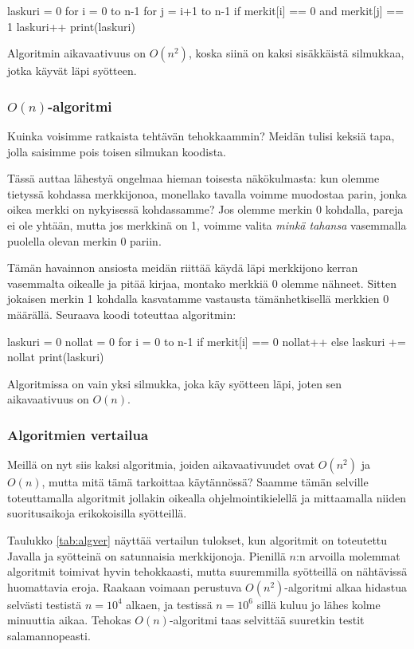 \begin{code}
laskuri = 0
for i = 0 to n-1
    for j = i+1 to n-1
        if merkit[i] == 0 and merkit[j] == 1
            laskuri++
print(laskuri)
\end{code}

Algoritmin aikavaativuus on $O(n^2)$, koska siinä on kaksi
sisäkkäistä silmukkaa, jotka käyvät läpi syötteen.

\subsubsection{$O(n)$-algoritmi}

Kuinka voisimme ratkaista tehtävän tehokkaammin?
Meidän tulisi keksiä tapa, jolla saisimme
pois toisen silmukan koodista.

Tässä auttaa lähestyä ongelmaa hieman toisesta
näkökulmasta: kun olemme tietyssä kohdassa merkkijonoa,
monellako tavalla voimme muodostaa parin,
jonka oikea merkki on nykyisessä kohdassamme?
Jos olemme merkin 0 kohdalla, pareja ei ole yhtään,
mutta jos merkkinä on 1, voimme valita \emph{minkä tahansa}
vasemmalla puolella olevan merkin 0 pariin.

Tämän havainnon ansiosta meidän riittää käydä läpi
merkkijono kerran vasemmalta oikealle ja pitää kirjaa,
montako merkkiä 0 olemme nähneet.
Sitten jokaisen merkin 1 kohdalla kasvatamme
vastausta tämänhetkisellä merkkien 0 määrällä.
Seuraava koodi toteuttaa algoritmin:

\begin{code}
laskuri = 0
nollat = 0
for i = 0 to n-1
    if merkit[i] == 0
        nollat++
    else
        laskuri += nollat
print(laskuri)
\end{code}

Algoritmissa on vain yksi silmukka, joka käy syötteen läpi,
joten sen aikavaativuus on $O(n)$.

\subsubsection{Algoritmien vertailua}

Meillä on nyt siis kaksi algoritmia, joiden aikavaativuudet ovat
$O(n^2)$ ja $O(n)$, mutta mitä tämä tarkoittaa käytännössä?
Saamme tämän selville toteuttamalla algoritmit jollakin
oikealla ohjelmointikielellä
ja mittaamalla niiden suoritusaikoja erikokoisilla syötteillä.

Taulukko \ref{tab:algver} näyttää vertailun tulokset,
kun algoritmit on toteutettu Javalla ja syötteinä
on satunnaisia merkkijonoja.
Pienillä $n$:n arvoilla molemmat algoritmit toimivat
hyvin tehokkaasti, mutta suuremmilla syötteillä on
nähtävissä huomattavia eroja.
Raakaan voimaan perustuva $O(n^2)$-algoritmi
alkaa hidastua selvästi testistä $n=10^4$ alkaen,
ja testissä $n=10^6$ sillä kuluu jo lähes kolme minuuttia aikaa.
Tehokas $O(n)$-algoritmi taas selvittää suuretkin testit
salamannopeasti.


